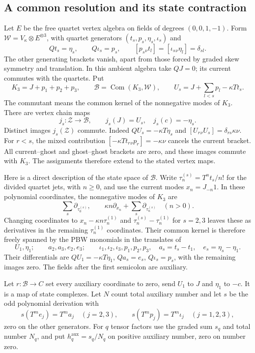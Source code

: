 \subsection{A common resolution and its state contraction}

Let $E$ be the free quartet vertex algebra on fields of degrees
$(0,0,1,-1)$. Form $\mathcal W=V_\kappa\otimes E^{\otimes3}$,
with quartet generators $(t_s,p_s,\eta_s,\iota_s)$ and
\[
 Qt_s=\eta_s,\qquad Q\iota_s=p_s,
 \qquad [p_s{}_\nu t_l]=[\iota_s{}_\nu\eta_l]=\delta_{sl}.
\]
The other generating brackets vanish, apart from those forced
by graded skew symmetry and translation. In this ambient
algebra take $QJ=0$; its current commutes with the quartets.
Put
\[
 K_3=J+p_1+p_2+p_3,\qquad
 \mathcal B=\operatorname{Com}(K_3,\mathcal W),\qquad
 U_s=J+\sum_{l<s}p_l-\kappa Tt_s.
\]
The commutant means the common kernel of the nonnegative modes
of $K_3$. There are vertex chain maps
\begin{equation}\label{eq:vol2-supported-slots}
 j_s:\mathcal Z\longrightarrow\mathcal B,
 \qquad j_s(J)=U_s,\quad j_s(c)=-\eta_s.
\end{equation}
Distinct images $j_s(\mathcal Z)$ commute.
Indeed $QU_s=-\kappa T\eta_s$ and
$[U_r{}_\nu U_s]=\delta_{rs}\kappa\nu$.
For $r<s$, the mixed contribution
$[-\kappa Tt_r{}_\nu p_r]=-\kappa\nu$ cancels the
current bracket. All current--ghost and ghost--ghost
brackets are zero, and these images commute with $K_3$.
The assignments therefore extend to the stated vertex maps.

Here is a direct description of the state space of $\mathcal B$.
Write $\tau^{(s)}_n=T^nt_s/n!$ for the divided quartet jets,
with $n\geq0$, and use the current modes $x_n=J_{-n}1$.
In these polynomial coordinates, the nonnegative modes of $K_3$
are
\[
 \sum_s\partial_{\tau^{(s)}_0},\qquad
 \kappa n\partial_{x_n}+\sum_s\partial_{\tau^{(s)}_n}\quad(n>0).
\]
Changing coordinates to
$x_n-\kappa n\tau^{(1)}_n$ and
$\tau^{(s)}_n-\tau^{(1)}_n$ for $s=2,3$ leaves these as
derivatives in the remaining $\tau^{(1)}_n$ coordinates.
Their common kernel is therefore freely spanned by the PBW
monomials in the translates of
\[
 U_1,\eta_1;\qquad
 a_2,a_3,e_2,e_3;\qquad
 \iota_1,\iota_2,\iota_3,p_1,p_2,p_3,
 \quad a_s=t_s-t_1,\quad e_s=\eta_s-\eta_1.
\]
Their differentials are
$QU_1=-\kappa T\eta_1$, $Qa_s=e_s$, $Q\iota_s=p_s$,
with the remaining images zero. The fields after the first
semicolon are auxiliary.

Let $r:\mathcal B\to C$ set every auxiliary coordinate to
zero, send $U_1$ to $J$ and $\eta_1$ to $-c$. It is a map of
state complexes. Let $N$ count total auxiliary number and let
$s$ be the odd polynomial derivation with
\[
 s(T^me_j)=T^ma_j\quad(j=2,3),\qquad
 s(T^mp_j)=T^m\iota_j\quad(j=1,2,3),
\]
zero on the other generators. For $q$ tensor factors use the
graded sum $s_q$ and total number $N_q$, and put
$h_q^{\mathrm{aux}}=s_q/N_q$ on positive auxiliary number,
zero on number zero.

